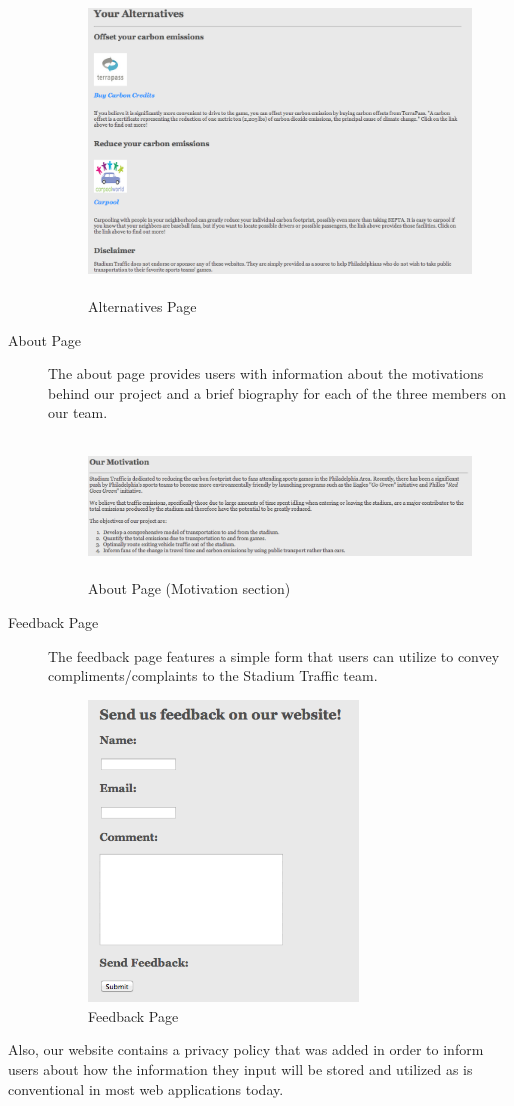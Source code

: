 \begin{description}
  \begin{figure}[htp]
    \centering
    \includegraphics[height=8cm]{graphics/website/alternatives.png}
    \caption{Alternatives Page}
  \end{figure}

    \item[About Page] The about page provides users with information
  about the motivations behind our project and a brief biography for
  each of the three members on our team.

  \begin{figure}[htp]
    \centering
    \includegraphics[height=3.65cm]{graphics/website/motivation.png}
    \caption{About Page (Motivation section)}
  \end{figure}

    \item[Feedback Page] The feedback page features a simple form that
  users can utilize to convey compliments/complaints to the Stadium
  Traffic team.

  \begin{figure}[htp]
    \centering
    \includegraphics[height=8cm]{graphics/website/feedback.png}
    \caption{Feedback Page}
  \end{figure}
\end{description}

Also, our website contains a privacy policy that was added in order to
inform users about how the information they input will be stored and
utilized as is conventional in most web applications today.
